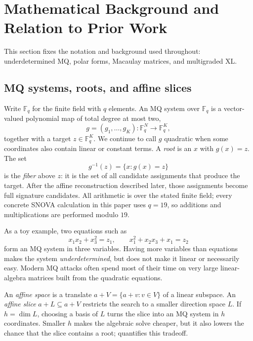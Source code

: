 \documentclass[11pt]{article}
\newcommand{\F}{\mathbb F}
\newcommand{\SNOVA}{\textsf{SNOVA}}
\begin{document}
\section{Mathematical Background and Relation to Prior Work}\label{sec:mq-background}

This section fixes the notation and background used throughout: underdetermined
MQ, polar forms, Macaulay matrices, and multigraded XL.

\subsection{MQ systems, roots, and affine slices}\label{sec:mq-primer}

Write $\F_q$ for the finite field with $q$ elements.  An MQ system over
$\F_q$ is a vector-valued polynomial map of total degree at most two,
\[
  g=(g_1,\ldots,g_K):\F_q^N\longrightarrow\F_q^K,
\]
together with a target $z\in\F_q^K$.  We continue to call $g$ quadratic when
some coordinates also contain linear or constant terms.  A \emph{root} is an
$x$ with $g(x)=z$.
The set
\[
  g^{-1}(z)=\{x:g(x)=z\}
\]
is the \emph{fiber} above $z$: it is the set of all candidate assignments
that produce the target.  After the affine reconstruction described later,
those assignments become full signature candidates.  All arithmetic is over
the stated finite field; every concrete \SNOVA{} calculation in this paper uses
$q=19$, so additions and multiplications are performed modulo $19$.

As a toy example, two equations such as
\[
 x_1x_2+x_3^2=z_1,
 \qquad
 x_1^2+x_2x_3+x_1=z_2
\]
form an MQ system in three variables.  Having more variables than equations
makes the system \emph{underdetermined}, but does not make it linear or
necessarily easy.  Modern MQ attacks often spend most of their time on very
large linear-algebra matrices built from the quadratic equations.

An \emph{affine space} is a translate $a+V=\{a+v:v\in V\}$ of a linear
subspace.  An \emph{affine slice} $a+L\subseteq a+V$ restricts the search to a
smaller direction space $L$.  If $h=\dim L$, choosing a basis of $L$ turns the
slice into an MQ system in $h$ coordinates.  Smaller $h$ makes the algebraic
solve cheaper, but it also lowers the chance that the slice contains a root;
 quantifies this tradeoff.
\end{document}
